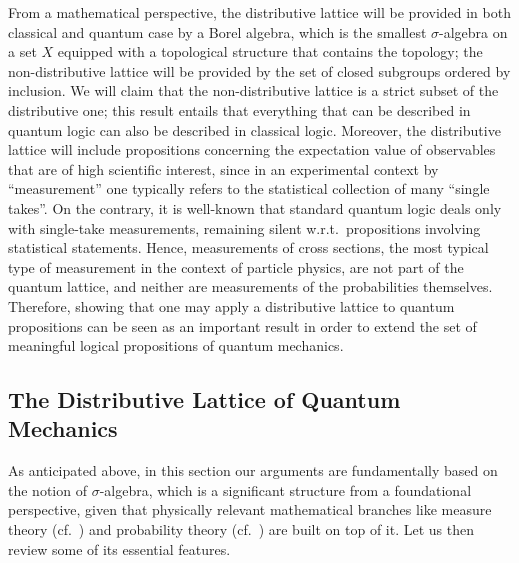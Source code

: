 \documentclass[11pt, executivepaper]{article}
\begin{document}
From a mathematical perspective, the distributive lattice will be provided in both classical and quantum case by a Borel algebra, which is the smallest $\sigma$-algebra on a set $X$ equipped with a topological structure that contains the topology; the non-distributive lattice will be provided by the set of closed subgroups ordered by inclusion. We will claim that the non-distributive lattice is a strict subset of the distributive one; this result entails that everything that can be described in quantum logic can also be described in classical logic. Moreover, the distributive lattice will include propositions concerning the expectation value of observables that are of high scientific interest, since in an experimental context by ``measurement'' one typically refers to the statistical collection of many ``single takes''. On the contrary, it is well-known that standard quantum logic deals only with single-take measurements, remaining silent w.r.t.\ propositions involving statistical statements. Hence, measurements of cross sections, the most typical type of measurement in the context of particle physics, are not part of the quantum lattice, and neither are measurements of the probabilities themselves. Therefore, showing that one may apply a distributive lattice to quantum propositions can be seen as an important result in order to extend the set of meaningful logical propositions of quantum mechanics.  

\subsection{The Distributive Lattice of Quantum Mechanics}

As anticipated above, in this section our arguments are fundamentally based on the notion of $\sigma$-algebra, which is a significant structure from a foundational perspective, given that physically relevant mathematical branches like measure theory (cf.\ \cite{Cohn:2013}) and probability theory (cf.\ \cite{Grimmett:2001}) are built on top of it. Let us then review some of its essential features.
\end{document}

